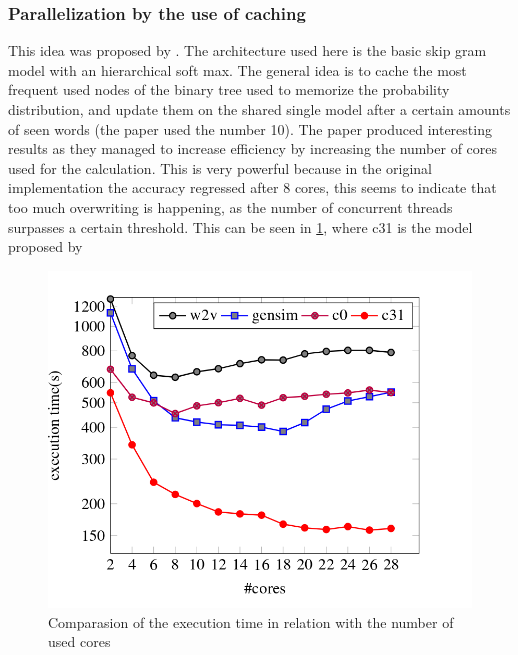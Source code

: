 \subsubsection{Parallelization by the use of caching}
This idea was proposed by \cite{efficient}. The architecture used here is the basic skip gram model with an hierarchical soft max.  The general idea is to cache the most frequent used nodes of the binary tree used to memorize the probability distribution, and update them on the shared single model after a certain amounts of seen words (the paper used the number 10). The paper produced interesting results as they managed to increase efficiency by increasing the number of cores used for the calculation. This is very powerful because in the original implementation the accuracy regressed after 8 cores, this seems to indicate that too much overwriting is happening, as the number of concurrent threads surpasses a certain threshold. This can be seen in \ref{fig:efficient}, where c31 is the model proposed by \cite{efficient}
\begin{figure}[ht]
    \centering
			\includegraphics[scale=0.3]{images/cachingEfficiency.png} 
    \caption{Comparasion of the execution time in relation with the number of used cores \cite{efficient}}
    \label{fig:efficient}
\end{figure}

